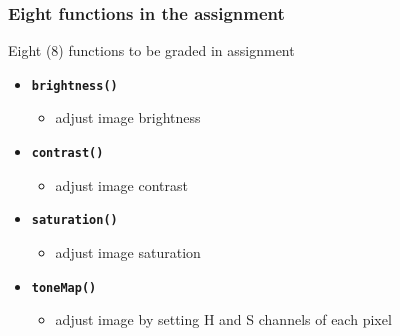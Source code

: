 \documentclass[english,14pt]{beamer}
\newcommand\red[1]{{\color{red} #1}}
\begin{document}
\begin{frame}[fragile]

\frametitle{Eight functions in the assignment}

Eight (8) functions to be graded in assignment

\vspace*{5mm}

\begin{itemize}
	\item \textbf{\red{\texttt{brightness()}}}
	\begin{itemize}
		\item adjust image brightness
	\end{itemize}
		
	\item \textbf{\red{\texttt{contrast()}}}
	\begin{itemize}
		\item adjust image contrast
	\end{itemize}
			
	\item \textbf{\red{\texttt{saturation()}}}
	\begin{itemize}
		\item adjust image saturation
	\end{itemize}
			
	\item \textbf{\red{\texttt{toneMap()}}}
	\begin{itemize}
		\item adjust image by setting H and S channels of each pixel
	\end{itemize}
\end{itemize}

\end{frame}

\end{document}
